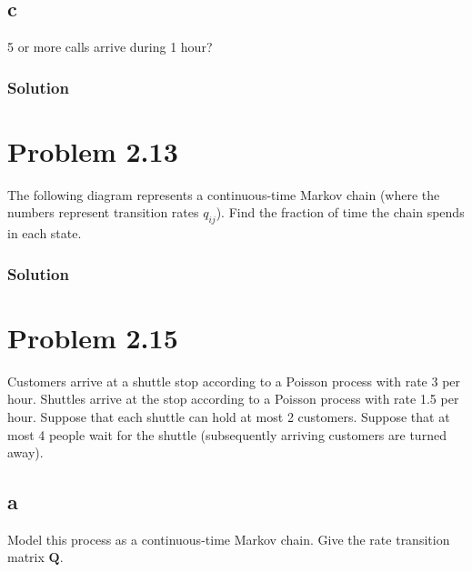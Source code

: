 \documentclass[letterpaper]{amsart}
\begin{document}
\subsection*{c}
5 or more calls arrive during 1 hour?
\subsubsection*{Solution}

\section{Problem 2.13} %
The following diagram represents a continuous-time Markov chain (where
the numbers represent transition rates $q_{ij}$). Find the fraction of time the
chain spends in each state.
\begin{figure}[!h]
\end{figure}

\subsubsection*{Solution}

\section{Problem 2.15} %
Customers arrive at a shuttle stop according to a Poisson process with rate 3
per hour. Shuttles arrive at the stop according to a Poisson process with
rate 1.5 per hour. Suppose that each shuttle can hold at most 2 customers.
Suppose that at most 4 people wait for the shuttle (subsequently arriving
customers are turned away).
\subsection*{a}
 Model this process as a continuous-time Markov chain. Give the rate
 transition matrix $\mathbf{Q}$.
\end{document}
